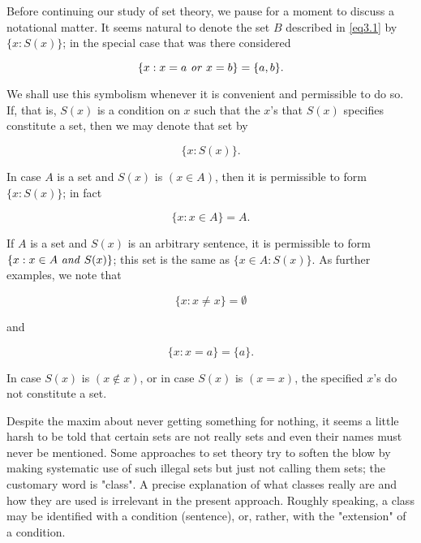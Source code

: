 Before continuing our study of set theory, we pause for a moment to discuss a notational matter. It seems natural to denote the set $B$ described in \eqref{eq3.1} by $\{x: S(x)\}$; in the special case that was there considered

\begin{equation*}
\{ x : x = a \text{ \textit{or} } x = b \} = \{ a,b \}.
\end{equation*}

We shall use this symbolism whenever it is convenient and permissible to do so. If, that is, $S(x)$ is a condition on $x$ such that the $x$'s that $S(x)$ specifies constitute a set, then we may denote that set by 

\begin{equation*}
\{ x : S(x) \}.
\end{equation*}

In case $A$ is a set and $S(x)$ is $(x \in A)$, then it is permissible to form $\{x: S(x)\}$; in fact 

\begin{equation*}
\{ x : x \in A \} = A.
\end{equation*}

If $A$ is a set and $S(x)$ is an arbitrary sentence, it is permissible to form $ \{ x : x \in A \text{ \textit{and} } S(x) \}$; this set is the same as $\{x \in A: S(x) \}$. As further examples, we note that 

\begin{equation*}
\{ x : x \neq x \} = \emptyset
\end{equation*}

and

\begin{equation*}
\{ x : x = a \} = \{ a \}.
\end{equation*}

In case $S(x)$ is $(x \notin x)$, or in case $S(x)$ is $(x = x)$, the specified $x$'s do not constitute a set. 

Despite the maxim about never getting something for nothing, it seems a little harsh to be told that certain sets are not really sets and even their names must never be mentioned. Some approaches to set theory try to soften the blow by making systematic use of such illegal sets but just not calling them sets; the customary word is "class". A precise explanation of what classes really are and how they are used is irrelevant in the present approach. Roughly speaking, a class may be identified with a condition (sentence), or, rather, with the "extension" of a condition.